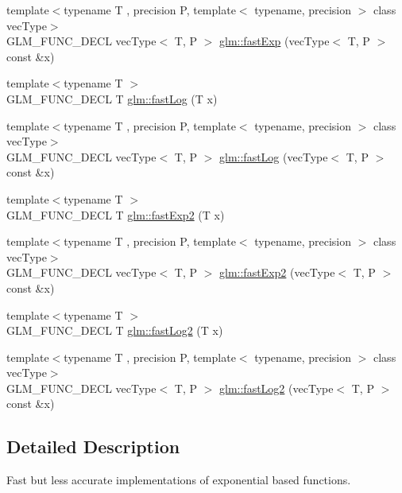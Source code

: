 \begin{DoxyCompactItemize}
{\footnotesize template$<$typename T , precision P, template$<$ typename, precision $>$ class vec\+Type$>$ }\\G\+L\+M\+\_\+\+F\+U\+N\+C\+\_\+\+D\+E\+CL vec\+Type$<$ T, P $>$ \hyperlink{group__gtx__fast__exponential_ga4faf0b61115de36efcf47c4ecb55a5fa}{glm\+::fast\+Exp} (vec\+Type$<$ T, P $>$ const \&x)
\item 
{\footnotesize template$<$typename T $>$ }\\G\+L\+M\+\_\+\+F\+U\+N\+C\+\_\+\+D\+E\+CL T \hyperlink{group__gtx__fast__exponential_gae1bdc97b7f96a600e29c753f1cd4388a}{glm\+::fast\+Log} (T x)
\item 
{\footnotesize template$<$typename T , precision P, template$<$ typename, precision $>$ class vec\+Type$>$ }\\G\+L\+M\+\_\+\+F\+U\+N\+C\+\_\+\+D\+E\+CL vec\+Type$<$ T, P $>$ \hyperlink{group__gtx__fast__exponential_ga789abcbc34d08008d2f5a4547dd6e5e3}{glm\+::fast\+Log} (vec\+Type$<$ T, P $>$ const \&x)
\item 
{\footnotesize template$<$typename T $>$ }\\G\+L\+M\+\_\+\+F\+U\+N\+C\+\_\+\+D\+E\+CL T \hyperlink{group__gtx__fast__exponential_ga0af50585955eb14c60bb286297fabab2}{glm\+::fast\+Exp2} (T x)
\item 
{\footnotesize template$<$typename T , precision P, template$<$ typename, precision $>$ class vec\+Type$>$ }\\G\+L\+M\+\_\+\+F\+U\+N\+C\+\_\+\+D\+E\+CL vec\+Type$<$ T, P $>$ \hyperlink{group__gtx__fast__exponential_ga9e6219327b7a33077dbec7620d981fff}{glm\+::fast\+Exp2} (vec\+Type$<$ T, P $>$ const \&x)
\item 
{\footnotesize template$<$typename T $>$ }\\G\+L\+M\+\_\+\+F\+U\+N\+C\+\_\+\+D\+E\+CL T \hyperlink{group__gtx__fast__exponential_ga6e98118685f6dc9e05fbb13dd5e5234e}{glm\+::fast\+Log2} (T x)
\item 
{\footnotesize template$<$typename T , precision P, template$<$ typename, precision $>$ class vec\+Type$>$ }\\G\+L\+M\+\_\+\+F\+U\+N\+C\+\_\+\+D\+E\+CL vec\+Type$<$ T, P $>$ \hyperlink{group__gtx__fast__exponential_gabc46086fe6636b8be87f09e6c5d2bb58}{glm\+::fast\+Log2} (vec\+Type$<$ T, P $>$ const \&x)
\end{DoxyCompactItemize}


\subsection{Detailed Description}
Fast but less accurate implementations of exponential based functions. 

